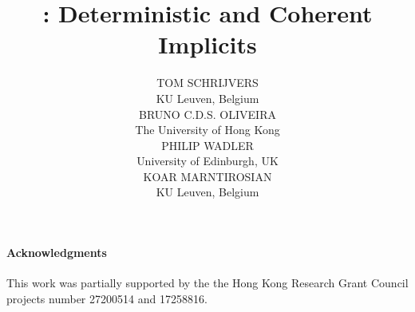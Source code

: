 \documentclass{jfp1}
\title[Cochis: Deterministic and Coherent Implicits]{\name: Deterministic and Coherent Implicits}
\author[T. Schrijvers, B. Oliveira, P. Wadler and K. Marntirosian]
       {TOM SCHRIJVERS \\
        KU Leuven, Belgium \\
        BRUNO C.D.S. OLIVEIRA \\
        The University of Hong Kong \\
        PHILIP WADLER \\ 
        University of Edinburgh, UK \\
        KOAR MARNTIROSIAN \\
        KU Leuven, Belgium
}
\begin{document}
\begingroup
\linenumbers

\maketitle

\begin{abstract}

\end{abstract}














%






\paragraph{Acknowledgments}
This work was
partially supported by the the Hong Kong Research Grant Council
projects number 27200514 and 17258816.

\newpage


\newpage
\appendix






\endgroup
\end{document}
